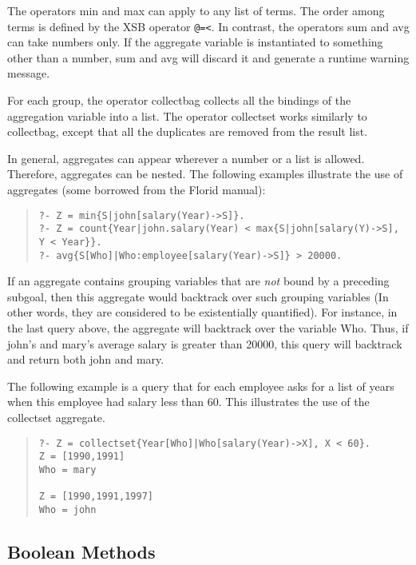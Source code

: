 \documentclass[11pt]{article}
\newcommand{\FLORID}{{\mbox{\sc Florid}}\xspace}
\begin{document}
The operators {\sf min} and {\sf max} can apply to any list of
terms. The order among terms is defined by the XSB operator {\tt @=<}.  In
contrast, the operators {\sf sum} and {\sf avg} can take numbers only. If
the aggregate variable is instantiated to something other than a
number, {\sf sum} and {\sf avg} will discard it and generate a runtime
warning message.

For each group, the operator {\sf collectbag} collects all the bindings of
the aggregation variable into a list. The operator {\sf collectset} works
similarly to {\sf collectbag}, except that all the duplicates are removed
from the result list.

In general, aggregates can appear wherever a number or a list is
allowed. Therefore, aggregates can be nested. The following examples
illustrate the use of aggregates (some borrowed from the \FLORID manual):
\begin{quote}
\begin{verbatim}
?- Z = min{S|john[salary(Year)->S]}.
?- Z = count{Year|john.salary(Year) < max{S|john[salary(Y)->S], Y < Year}}.
?- avg{S[Who]|Who:employee[salary(Year)->S]} > 20000. 
\end{verbatim}
\end{quote}
If an aggregate contains grouping variables that are \emph{not} bound by a
preceding subgoal, then this aggregate would backtrack over such grouping
variables (In other words, they are considered to be existentially
quantified). For instance, in the last query above, the aggregate will
backtrack over the variable {\sf Who}. Thus, if {\sf john}'s and
{\sf mary}'s average salary is greater than 20000, this query will backtrack
and return both {\sf john} and {\sf mary}.

The following example is a query that for each employee asks for a list of
years when this employee had salary less than 60. This illustrates the use
of the {\sf collectset} aggregate.
\begin{quote}
\begin{verbatim}
?- Z = collectset{Year[Who]|Who[salary(Year)->X], X < 60}.
Z = [1990,1991]
Who = mary

Z = [1990,1991,1997]
Who = john
\end{verbatim}
\end{quote}


\subsection{Boolean Methods}
\end{document}
